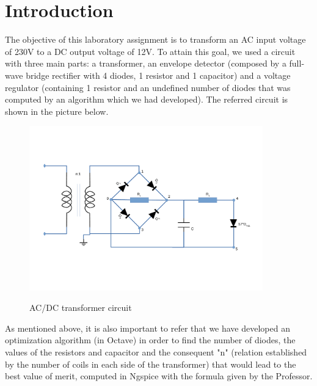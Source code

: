 \newpage
\section{Introduction}
\label{sec:introduction}

The objective of this laboratory assignment is to transform an AC input voltage of 230V to a DC output voltage of 12V. To attain this goal, we used a circuit with three main parts: a transformer, an envelope detector (composed by a full-wave bridge rectifier with 4 diodes, 1 resistor and 1 capacitor) and a voltage regulator (containing 1 resistor and an undefined number of diodes that was computed by an algorithm which we had developed). The referred circuit is shown in the picture below. 

\bigskip 

\begin{figure}[!ht] \centering
\caption{AC/DC transformer circuit}
\squeezeup 
\includegraphics[width=0.9\textwidth, scale=1.0]{DesenhoT3.pdf}
\squeezeup 
\squeezeup 
\squeezeup 
\squeezeup 
\label{fig:circuit}
\end{figure}

As mentioned above, it is also important to refer that we have developed an optimization algorithm (in Octave) in order to find the number of diodes, the values of the resistors and capacitor and the consequent "n" (relation established by the number of coils in each side of the transformer) that would lead to the best value of merit, computed in Ngspice with the formula given by the Professor.   


